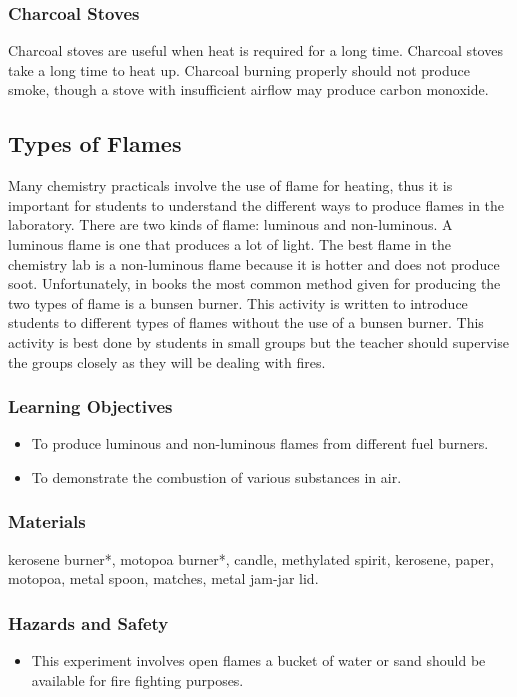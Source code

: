 \subsubsection{Charcoal Stoves}

Charcoal stoves are useful when heat is required for a long time. Charcoal stoves take a long time to heat up. Charcoal burning properly should not produce smoke, though a stove with insufficient airflow may produce carbon monoxide.

\subsection{Types of Flames}
Many chemistry practicals involve the use of flame for heating, thus it is important for students to understand the different ways to produce flames in the laboratory. There are two kinds of flame: luminous and non-luminous. A luminous flame is one that produces a lot of light. The best flame in the chemistry lab is a non-luminous flame because it is hotter and does not produce soot. Unfortunately, in books the most common method given for producing the two types of flame is a bunsen burner. This activity is written to introduce students to different types of flames without the use of a bunsen burner. This activity is best done by students in small groups but the teacher should supervise the groups closely as they will be dealing with fires.
\subsubsection*{Learning Objectives}
\begin{itemize}
\item{To produce luminous and non-luminous flames from different fuel burners.}
\item{To demonstrate the combustion of various substances in air.}
\end{itemize}

\subsubsection*{Materials}
kerosene burner*, motopoa burner*, candle,  methylated spirit, kerosene, paper, motopoa, metal spoon, matches, metal jam-jar lid.

\subsubsection*{Hazards and Safety}
\begin{itemize}
\item{This experiment involves open flames a bucket of water or sand should be available for fire fighting purposes.}
\end{itemize}


